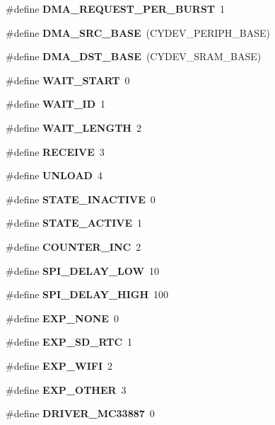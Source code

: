 \begin{DoxyCompactItemize}
\mbox{\label{globals_8h_ab4613f8bee68bc68fa6fe94a3ae6d568}} 
\#define {\bfseries D\+M\+A\+\_\+\+R\+E\+Q\+U\+E\+S\+T\+\_\+\+P\+E\+R\+\_\+\+B\+U\+R\+ST}~1
\item 
\mbox{\label{globals_8h_a3cc2eedb40809a1f15ad841c8abbcebf}} 
\#define {\bfseries D\+M\+A\+\_\+\+S\+R\+C\+\_\+\+B\+A\+SE}~(C\+Y\+D\+E\+V\+\_\+\+P\+E\+R\+I\+P\+H\+\_\+\+B\+A\+SE)
\item 
\mbox{\label{globals_8h_aa54e301f446a66cbf8c943d920c8e967}} 
\#define {\bfseries D\+M\+A\+\_\+\+D\+S\+T\+\_\+\+B\+A\+SE}~(C\+Y\+D\+E\+V\+\_\+\+S\+R\+A\+M\+\_\+\+B\+A\+SE)
\item 
\#define \textbf{ W\+A\+I\+T\+\_\+\+S\+T\+A\+RT}~0
\item 
\#define \textbf{ W\+A\+I\+T\+\_\+\+ID}~1
\item 
\#define \textbf{ W\+A\+I\+T\+\_\+\+L\+E\+N\+G\+TH}~2
\item 
\#define \textbf{ R\+E\+C\+E\+I\+VE}~3
\item 
\#define \textbf{ U\+N\+L\+O\+AD}~4
\item 
\#define \textbf{ S\+T\+A\+T\+E\+\_\+\+I\+N\+A\+C\+T\+I\+VE}~0
\item 
\#define \textbf{ S\+T\+A\+T\+E\+\_\+\+A\+C\+T\+I\+VE}~1
\item 
\#define \textbf{ C\+O\+U\+N\+T\+E\+R\+\_\+\+I\+NC}~2
\item 
\mbox{\label{globals_8h_a42c6406a75a89d50c9f1b9c86388565c}} 
\#define {\bfseries S\+P\+I\+\_\+\+D\+E\+L\+A\+Y\+\_\+\+L\+OW}~10
\item 
\mbox{\label{globals_8h_a054002df34537a2a4ff6f520b65f1ba4}} 
\#define {\bfseries S\+P\+I\+\_\+\+D\+E\+L\+A\+Y\+\_\+\+H\+I\+GH}~100
\item 
\mbox{\label{globals_8h_a963cfc2155941aff08c02b451042c295}} 
\#define {\bfseries E\+X\+P\+\_\+\+N\+O\+NE}~0
\item 
\mbox{\label{globals_8h_a6a936c7ef5908ffabf8be42833a3daee}} 
\#define {\bfseries E\+X\+P\+\_\+\+S\+D\+\_\+\+R\+TC}~1
\item 
\mbox{\label{globals_8h_a25767403f2ad21cf275206135269647e}} 
\#define {\bfseries E\+X\+P\+\_\+\+W\+I\+FI}~2
\item 
\mbox{\label{globals_8h_a265e7aabffe2182cd632b15dd02a9efb}} 
\#define {\bfseries E\+X\+P\+\_\+\+O\+T\+H\+ER}~3
\item 
\mbox{\label{globals_8h_a20e659d92cc540a195717f8cc2dd4b42}} 
\#define {\bfseries D\+R\+I\+V\+E\+R\+\_\+\+M\+C33887}~0
\item 
\mbox{\label{globals_8h_a2e6a13011f6123a8f0c064e37b116880}} 

\end{DoxyCompactItemize}
